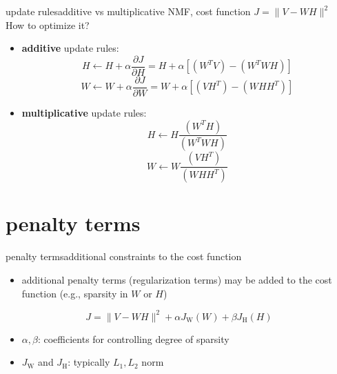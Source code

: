         \begin{frame}{update rules}{additive vs multiplicative} 
           NMF, cost function $J = \parallel V - WH\parallel^{2}$\\ How to optimize it? 
           \begin{itemize}
                \item  \textbf{additive} update rules:
                \begin{equation*}
                H \leftarrow H + \alpha \frac{\partial J}{\partial H} = H + \alpha [(W^{T}V) - (W^{T}WH)]
                \end{equation*}
                \begin{equation*}
                W \leftarrow W + \alpha \frac{\partial J}{\partial W} = W + \alpha [(VH^{T}) - (WHH^{T})]
                \end{equation*}
			   \item  \textbf{multiplicative} update rules:
                \begin{equation*}
                H \leftarrow H \frac{(W^{T}H)}{(W^{T}WH)}
                \end{equation*}
                \begin{equation*}
                W \leftarrow W \frac{(VH^{T})}{(WHH^{T})}
                \end{equation*}
           \end{itemize}
        \end{frame}        
    
    \section[penalty terms]{penalty terms}
        \begin{frame}{penalty terms}{additional constraints to the cost function}
            \begin{itemize}
                \item   additional penalty terms (regularization terms) may be added to the cost function (e.g., sparsity in $W$ or $H$)
            \end{itemize}
            \begin{equation*}
                J = \parallel V - WH\parallel^{2} + \alpha J_\mathrm{W}(W) + \beta J_\mathrm{H}(H)
            \end{equation*}
            \begin{itemize}
                \item $\alpha,\beta$: coefficients for controlling degree of sparsity
                \item $J_\mathrm{W}$ and $J_\mathrm{H}$: typically $L_{1},L_{2}$ norm 
            \end{itemize}
        \end{frame}
              
